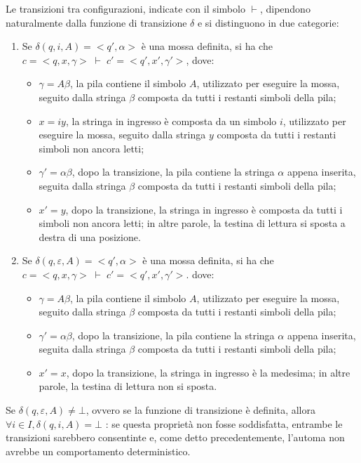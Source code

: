   Le transizioni tra configurazioni, indicate con il simbolo \(\vdash\), dipendono naturalmente dalla funzione di transizione \(\delta\) e si distinguono in due categorie:
  \begin{enumerate}
    \item Se \(\delta(q,i,A) =<q', \alpha>\) è una mossa definita, si ha che \(c=<q,x,\gamma>\; \vdash \; c'=<q',x',\gamma'>\), dove:
    \begin{itemize}
      \item \(\gamma = A\beta\), la pila contiene il simbolo \(A\), utilizzato per eseguire la mossa, seguito dalla stringa \(\beta\) composta da tutti i restanti simboli della pila;
      \item \(x=iy\), la stringa in ingresso è composta da un simbolo \(i\), utilizzato per eseguire la mossa, seguito dalla stringa \(y\) composta da tutti i restanti simboli non ancora letti;
      \item \(\gamma'=\alpha\beta\), dopo la transizione, la pila contiene la stringa \(\alpha\) appena inserita, seguita dalla stringa \(\beta\) composta da tutti i restanti simboli della pila;
      \item \(x'=y\), dopo la transizione, la stringa in ingresso è composta da tutti i simboli non ancora letti; in altre parole, la testina di lettura si sposta a destra di una posizione. 
    \end{itemize}
    \item Se \(\delta(q,\varepsilon, A) =<q', \alpha>\) è una mossa definita, si ha che \(c=<q,x,\gamma>\;\vdash\; c'=<q',x',\gamma'>\). dove:
    \begin{itemize}
      \item \(\gamma=A\beta\), la pila contiene il simbolo \(A\), utilizzato per eseguire la mossa, seguito dalla stringa \(\beta\) composta da tutti i restanti simboli della pila;
      \item \(\gamma'=\alpha\beta\), dopo la transizione, la pila contiene la stringa \(\alpha\) appena inserita, seguita dalla stringa \(\beta\) composta da tutti i restanti simboli della pila;
      \item \(x'=x\), dopo la transizione, la stringa in ingresso è la medesima; in altre parole, la testina di lettura non si sposta.
    \end{itemize}
  \end{enumerate}

  Se \(\delta(q,\varepsilon, A) \neq \bot\), ovvero se la funzione di transizione è definita, allora \(\forall i \in I, \delta(q,i,A)= \bot\) : se questa proprietà non fosse soddisfatta, entrambe le transizioni sarebbero consentinte e, come detto precedentemente, l'automa non avrebbe un comportamento deterministico.

